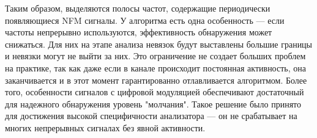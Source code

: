 Таким образом, выделяются полосы частот, содержащие периодически появляющиеся NFM сигналы. У алгоритма есть одна особенность --- если частоты непрерывно используются, эффективность обнаружения может снижаться. Для них на этапе анализа невязок будут выставлены большие границы и невязки могут не выйти за них. Это ограничение не создает больших проблем на практике, так как даже если в канале происходит постоянная активность, она заканчивается и в этот момент гарантированно отлавливается алгоритмом. Более того, особенности сигналов с цифровой модуляцией обеспечивают достаточный для надежного обнаружения уровень "молчания". Такое решение было принято для достижения высокой специфичности анализатора --- он не срабатывает на многих непрерывных сигналах без явной активности.
